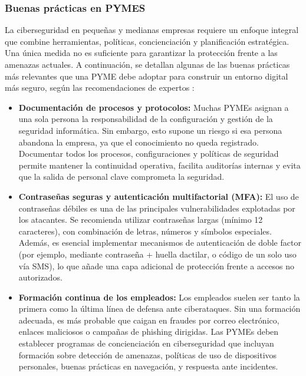 \documentclass[a4paper, 10pt]{article}
\begin{document}
    \subsubsection{Buenas prácticas en PYMES}
    
    La ciberseguridad en pequeñas y medianas empresas requiere un enfoque integral que combine herramientas, políticas, concienciación y planificación estratégica. Una única medida no es suficiente para garantizar la protección frente a las amenazas actuales. A continuación, se detallan algunas de las buenas prácticas más relevantes que una PYME debe adoptar para construir un entorno digital más seguro, según las recomendaciones de expertos \cite{toms2021}:
    
    \begin{itemize}
        
        \item \textbf{Documentación de procesos y protocolos:}  
        Muchas PYMEs asignan a una sola persona la responsabilidad de la configuración y gestión de la seguridad informática. Sin embargo, esto supone un riesgo si esa persona abandona la empresa, ya que el conocimiento no queda registrado. Documentar todos los procesos, configuraciones y políticas de seguridad permite mantener la continuidad operativa, facilita auditorías internas y evita que la salida de personal clave comprometa la seguridad.
    
        \item \textbf{Contraseñas seguras y autenticación multifactorial (MFA):}  
        El uso de contraseñas débiles es una de las principales vulnerabilidades explotadas por los atacantes. Se recomienda utilizar contraseñas largas (mínimo 12 caracteres), 
        con combinación de letras, números y símbolos especiales. Además, es esencial implementar mecanismos de autenticación de doble factor (por ejemplo, mediante contraseña + huella dactilar, o código de un solo uso vía SMS), lo que añade una capa adicional de protección frente a accesos no autorizados.
    
        \item \textbf{Formación continua de los empleados:}  
        Los empleados suelen ser tanto la primera como la última línea de defensa ante ciberataques. Sin una formación adecuada, es más probable que caigan en fraudes por correo electrónico, 
        enlaces maliciosos o campañas de phishing dirigidas. Las PYMEs deben establecer programas de concienciación en ciberseguridad que incluyan formación sobre detección de amenazas, políticas de uso de dispositivos personales, buenas prácticas en navegación, y respuesta ante incidentes.
    

\end{itemize}
\end{document}
